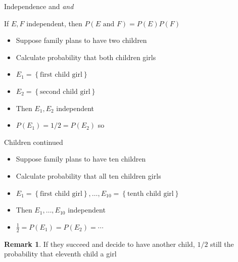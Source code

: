 \documentclass[handout]{beamer}
\theoremstyle{definition}
\newtheorem{remark}{Remark}
\begin{document}
\begin{frame}{Independence and \em{and}}
\begin{theorem}
If $E,F$ independent, then
$P\left(\text{$E$ and $F$}\right)=P\left(E\right)P\left(F\right)$
\end{theorem}
\begin{example}
\begin{itemize}
\item Suppose family plans to have two children
\item Calculate probability that both children girls
\item $E_1=\left\{\text{first child girl}\right\}$
\item $E_2=\left\{\text{second child girl}\right\}$
\item Then $E_1,E_2$ independent
\item $P\left(E_1\right)=1/2=P\left(E_2\right)$ so
\end{itemize}
\end{example}
\end{frame}

\begin{frame}{Children continued}
\begin{itemize}
\item Suppose family plans to have \alert{ten} children
\item Calculate probability that all ten children girls
\item $E_1=\left\{\text{first child girl}\right\},\ldots,
E_{10}=\left\{\text{tenth child girl}\right\}$
\item Then $E_1,\ldots,E_{10}$ independent
\item $\frac{1}{2}=P\left(E_1\right)=P\left(E_2\right)=\cdots$
\end{itemize}
\begin{remark}
If they succeed and decide to have another child,
$1/2$ still the probability that eleventh child a girl
\end{remark}
\end{frame}
\end{document}
